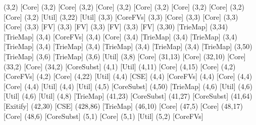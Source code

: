 {(3,2) [Core] %
(3,2) [Core] %
(3,2) [Core] %
(3,2) [Core] %
(3,2) [Core] %
(3,2) [Core] %
(3,2) [Core] %
(3,2) [Util] %
(3,22) [Util] %
(3,3) [CoreFVs] %
(3,3) [Core] %
(3,3) [Core] %
(3,3) [Core] %
(3,3) [FV] %
(3,3) [FV] %
(3,3) [FV] %
(3,3) [FV] %
(3,30) [TrieMap] %
(3,34) [TrieMap] %
(3,4) [CoreFVs] %
(3,4) [Core] %
(3,4) [TrieMap] %
(3,4) [TrieMap] %
(3,4) [TrieMap] %
(3,4) [TrieMap] %
(3,4) [TrieMap] %
(3,4) [TrieMap] %
(3,4) [TrieMap] %
(3,50) [TrieMap] %
(3,6) [TrieMap] %
(3,6) [Util] %
(3,8) [Core] %
(31,13) [Core] %
(32,10) [Core] %
(33,2) [Core] %
(34,2) [CoreSubst] %
(4,1) [Util] %
(4,11) [Core] %
(4,15) [Core] %
(4,2) [CoreFVs] %
(4,2) [Core] %
(4,22) [Util] %
(4,4) [CSE] %
(4,4) [CoreFVs] %
(4,4) [Core] %
(4,4) [Core] %
(4,4) [Util] %
(4,4) [Util] %
(4,5) [CoreSubst] %
(4,50) [TrieMap] %
(4,6) [Util] %
(4,6) [Util] %
(4,6) [Util] %
(4,8) [TrieMap] %
(41,23) [CoreSubst] %
(41,27) [CoreSubst] %
(41,64) [Exitify] %
(42,30) [CSE] %
(428,86) [TrieMap] %
(46,10) [Core] %
(47,5) [Core] %
(48,17) [Core] %
(48,6) [CoreSubst] %
(5,1) [Core] %
(5,1) [Util] %
(5,2) [CoreFVs] %
}
